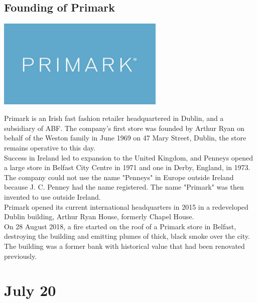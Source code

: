 \documentclass[11pt]{report}
\begin{document}
\subsection{Founding of Primark}
\vspace{2mm}\begin{center}\includegraphics[width=8cm]{./img/primarkLogo.jpg}\end{center}
Primark is an Irish fast fashion retailer headquartered in Dublin, and a subsidiary of ABF. The company's first store was founded by Arthur Ryan on behalf of the Weston family in June 1969 on 47 Mary Street, Dublin, the store remains operative to this day.\\
\indent Success in Ireland led to expansion to the United Kingdom, and Penneys opened a large store in Belfast City Centre in 1971 and one in Derby, England, in 1973. The company could not use the name "Penneys" in Europe outside Ireland because J. C. Penney had the name registered. The name "Primark" was then invented to use outside Ireland.\\
\indent Primark opened its current international headquarters in 2015 in a redeveloped Dublin building, Arthur Ryan House, formerly Chapel House.\\
\indent On 28 August 2018, a fire started on the roof of a Primark store in Belfast, destroying the building and emitting plumes of thick, black smoke over the city. The building was a former bank with historical value that had been renovated previously.
\section{July 20}
\end{document}
